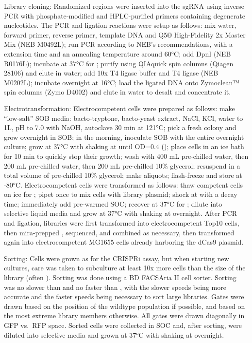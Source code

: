 \documentclass[10pt,oneside]{article}
\begin{document}
Library cloning: Randomized regions were inserted into the sgRNA using inverse PCR with phosphate-modified and HPLC-purified primers containing degenerate nucleotides.  The PCR and ligation reactions were setup as follows: mix  water,   forward primer,   reverse primer,   template DNA and  Q5® High-Fidelity 2x Master Mix (NEB M0492L); run PCR according to NEB's recommendations, with a  extension time and an annealing temperature around 60°C; add   DpnI (NEB R0176L); incubate at 37°C for ; purify using QIAquick spin columns (Qiagen 28106) and elute in  water; add  10x T4 ligase buffer and   T4 ligase (NEB M0202L); incubate overnight at 16°C; load the ligated DNA onto Zymoclean™ spin columns (Zymo D4002) and elute in  water to desalt and concentrate it.

Electrotransformation: Electrocompetent cells were prepared as follows: make ``low-salt'' SOB media:  bacto-tryptone,  bacto-yeast extract,   NaCl,   KCl, water to 1L, pH to 7.0 with NaOH, autoclave 30 min at 121°C; pick a fresh colony and grow overnight in  SOB; in the morning, inoculate  SOB with the entire overnight culture; grow at 37°C with shaking at  until OD=0.4 (); place cells in an ice bath for 10 min to quickly stop their growth; wash with 400 mL pre-chilled water, then 200 mL pre-chilled water, then 200 mL pre-chilled 10\% glycerol; resuspend in a total volume of  pre-chilled 10\% glycerol; make  aliquots; flash-freeze and store at -80°C.  Electrocompetent cells were transformed as follows: thaw competent cells on ice for ; pipet once to mix cells with   library plasmid; shock at  with a  decay time; immediately add  pre-warmed SOC; recover at 37°C for ; dilute into selective liquid media and grow at 37°C with shaking at  overnight.  After PCR and ligation, libraries were first transformed into electrocompetent Top10 cells, then mira-prepped \autocite{pronobis2016}, sequenced, and combined as necessary, then transformed again into electrocompetent MG1655 cells already harboring the dCas9 plasmid.

Sorting: Cells were grown as for the CRISPRi assay, but when starting new  cultures, care was taken to subculture at least 10x more cells than the size of the library (often ).  Sorting was done using a BD FACSAria II cell sorter.  Sorting was no slower than  and no faster than , with the slower speeds being more accurate and the faster speeds being necessary to sort large libraries.  Gates were drawn based on the position of the wildtype population if possible, and based on the most extreme library members otherwise.  All gates were drawn diagonally in GFP vs.\ RFP space.  Sorted cells were collected in  SOC and, after sorting, were diluted into selective media and grown at 37°C with shaking at  overnight.
\end{document}
